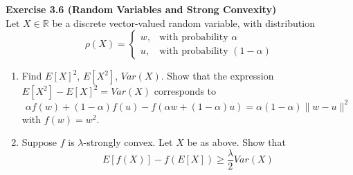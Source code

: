 \documentclass[
10pt, %
a4paper, %
oneside, %
headinclude,footinclude, %
BCOR5mm, %
]{scrartcl}
\newenvironment{problem}[2][]
               { \begin{mdframed}[backgroundcolor=gray!20] \textbf{#1 #2} \\}
               {  \end{mdframed}}
\begin{document}
\begin{problem}{Exercise 3.6 (Random Variables and Strong Convexity)}
  Let $X \in \mathbb{R}$ be a discrete vector-valued random variable, with distribution
  \[
  \rho(X) =
  \begin{cases}
    w, & \text{with probability }\alpha \\
    u, & \text{with probability }(1 - \alpha)
  \end{cases}
  \]
  \begin{enumerate}
      \item Find ${E[X]}^2$, $E[X^2]$, $Var(X)$. Show that the expression $E[X^2] - {E[X]}^2 = Var(X)$ corresponds to
      \[
      \alpha f(w) + (1 - \alpha) f(u) - f(\alpha w + (1 - \alpha) u) = \alpha (1 - \alpha) \|w - u\|^2
      \]
      with $f(w) = w^2$.

      \item Suppose $f$ is $\lambda$-strongly convex. Let $X$ be as above. Show that
      \[
      E[f(X)] - f(E[X]) \geq \frac{\lambda}{2} Var(X)
      \]
  \end{enumerate}
\end{problem}
\end{document}
